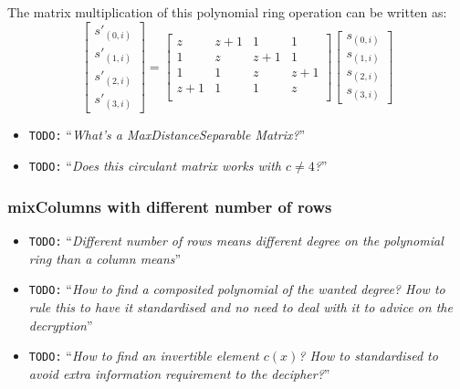 \documentclass[10pt,a4paper,twoside]{llncs}
\newcommand{\todo}[1]{\texttt{\color{red}TODO:} ``\emph{#1}''}
\begin{document}
The matrix multiplication of this polynomial ring operation can be written as:
\begin{equation}\label{eq:MDS}
  \begin{bmatrix}
    s'_{(0,i)}\\s'_{(1,i)}\\s'_{(2,i)}\\s'_{(3,i)}
  \end{bmatrix}
  =
  \begin{bmatrix}
    z & z+1 & 1 & 1 \\
    1 & z & z+1 & 1 \\
    1 & 1 & z & z+1 \\
    z+1 & 1 & 1 & z \\
  \end{bmatrix}
  \begin{bmatrix}
    s_{(0,i)}\\s_{(1,i)}\\s_{(2,i)}\\s_{(3,i)}
  \end{bmatrix}
\end{equation}

\begin{itemize}
 \item \todo{What's a MaxDistanceSeparable Matrix?}
 \item \todo{Does this circulant matrix works with $c\neq 4$?}
\end{itemize}

\subsubsection{mixColumns with different number of rows}

\begin{itemize}
 \item \todo{Different number of rows means different degree on the polynomial ring than a column means}
 \item \todo{How to find a composited polynomial of the wanted degree? How to rule this to have it standardised and no need to deal with it to advice on the decryption}
 \item \todo{How to find an invertible element $c(x)$? How to standardised to avoid extra information requirement to the decipher?}
\end{itemize}

\end{document}
